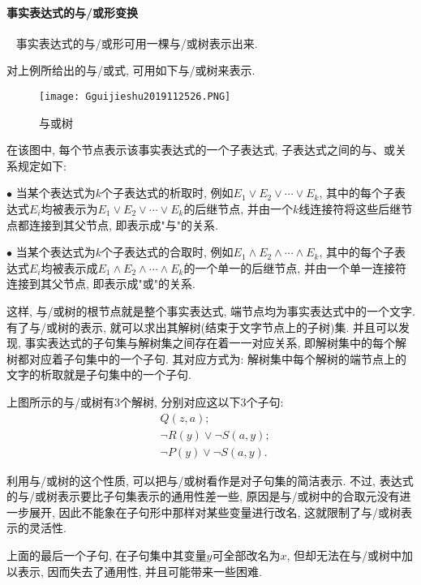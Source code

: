 \paragraph{事实表达式的与/或形变换}~{}
事实表达式的与/或形可用一棵与/或树表示出来.
\begin{example}对上例所给出的与/或式, 可用如下与/或树来表示.
\begin{figure}[H]
\centering
\texttt{[image: Gguijieshu2019112526.PNG]}
\caption{与或树}
\label{AI32fig26}
\end{figure}
在该图中, 每个节点表示该事实表达式的一个子表达式, 子表达式之间的与、或关系规定如下:

$\bullet$ 当某个表达式为$k$个子表达式的析取时, 例如$E_1\vee E_2\vee \cdots \vee E_k$, 其中的每个子表达式$E_i$均被表示为$E_1\vee E_2\vee \cdots \vee E_k$的后继节点, 并由一个$k$线连接符将这些后继节点都连接到其父节点, 即表示成"与"的关系.

$\bullet$ 当某个表达式为$k$个子表达式的合取时, 例如$E_1\wedge E_2\wedge \cdots \wedge E_k$, 其中的每个子表达式$E_i$均被表示成$E_1\wedge E_2\wedge \cdots \wedge E_k$的一个单一的后继节点, 并由一个单一连接符连接到其父节点, 即表示成"或"的关系.

这样, 与/或树的根节点就是整个事实表达式, 端节点均为事实表达式中的一个文字. 有了与/或树的表示, 就可以求出其解树(结束于文字节点上的子树)集. 并且可以发现, 事实表达式的子句集与解树集之间存在着一一对应关系, 即解树集中的每个解树都对应着子句集中的一个子句.
其对应方式为: 解树集中每个解树的端节点上的文字的析取就是子句集中的一个子句.

上图所示的与/或树有3个解树, 分别对应这以下3个子句:
\begin{align*}
    &Q(z, a);\\
    &\neg R(y)\vee  \neg  S(a, y);\\
    &\neg P(y)\vee  \neg  S(a, y).
\end{align*}
\end{example}

利用与/或树的这个性质, 可以把与/或树看作是对子句集的简洁表示. 不过, 表达式的与/或树表示要比子句集表示的通用性差一些, 原因是与/或树中的合取元没有进一步展开, 因此不能象在子句形中那样对某些变量进行改名, 这就限制了与/或树表示的灵活性.
\begin{example}
  上面的最后一个子句, 在子句集中其变量$y$可全部改名为$x$, 但却无法在与/或树中加以表示, 因而失去了通用性, 并且可能带来一些困难.
\end{example}


